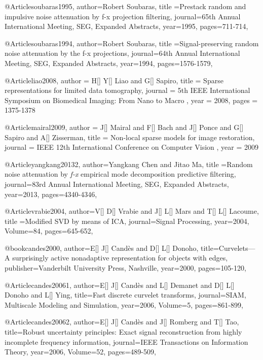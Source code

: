 {@Article{soubaras1995,
  author={Robert Soubaras},
  title ={Prestack random and impulsive noise attenuation by f-x projection filtering},
  journal={65th Annual International Meeting, SEG, Expanded Abstracts},
  year=1995,
  pages={711-714},
}

@Article{soubaras1994,
  author={Robert Soubaras},
  title ={Signal-preserving random noise attenuation by the f-x projections},
  journal={64th Annual International Meeting, SEG, Expanded Abstracts},
  year=1994,
  pages={1576-1579},
}

@Article{liao2008,
  author = 	 {H[] Y[] Liao and G[] Sapiro},
  title = 	 {Sparse representations for limited data tomography},
  journal = 	 {5th IEEE International Symposium on Biomedical Imaging: From Nano to Macro },
  year = 	 2008,
  pages = 	 {1375-1378}}

@Article{mairal2009,
  author = 	 {J[] Mairal and F[] Bach and J[] Ponce and G[] Sapiro and A[] Zisserman},
  title = 	 {Non-local sparse models for image restoration},
  journal = 	 {IEEE 12th International Conference on Computer Vision  },
  year = 	 2009}

@Article{yangkang20132,
  author={Yangkang Chen and Jitao Ma},
  title ={Random noise attenuation by \emph{f-x} empirical mode decomposition predictive filtering},
  journal={83rd Annual International Meeting, SEG, Expanded Abstracts},
  year=2013,
  pages={4340-4346},
}



@Article{vrabie2004,
  author={V[] D[] Vrabie and J[] L[] Mars and T[] L[] Lacoume},
  title ={Modified SVD by means of ICA},
  journal={Signal Processing},
  year=2004,
  Volume=84,
  pages={645-652},
}

@book{candes2000,
  author={E[] J[] Cand\`{e}s and D[] L[] Donoho},
  title={Curvelets—A surprisingly active nonadaptive representation for objects with edges},
  publisher={Vanderbilt University Press, Nashville},
  year=2000,
    pages={105-120},
}




@Article{candes20061,
  author={E[] J[] Cand\`{e}s and L[] Demanet and D[] L[] Donoho and L[] Ying},
  title={Fast discrete curvelet transforms},
  journal={SIAM, Multiscale Modeling and Simulation},
  year=2006,
  Volume=5,
  pages={861-899},
}

@Article{candes20062,
  author={E[] J[] Cand\`{e}s and J[] Romberg and T[] Tao},
  title={Robust uncertainty principles: Exact signal reconstruction from highly incomplete frequency information},
  journal={IEEE Transactions on Information Theory},
  year=2006,
  Volume=52,
  pages={489-509},
}

}
